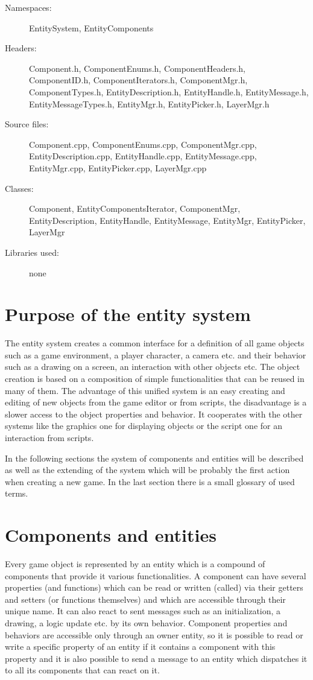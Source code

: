 \begin{description}
  \item[Namespaces:] EntitySystem, EntityComponents
  \item[Headers:] Component.h, ComponentEnums.h, ComponentHeaders.h, ComponentID.h, ComponentIterators.h, ComponentMgr.h, Com\-po\-nent\-Ty\-pes\-.h, EntityDescription.h, EntityHandle.h, EntityMessage.h, Entity\-Message\-Types.h, EntityMgr.h, EntityPicker.h, LayerMgr.h
  \item[Source files:] Component.cpp, ComponentEnums.cpp, ComponentMgr.cpp, EntityDescription.cpp, EntityHandle.cpp, EntityMessage.cpp, Entity\-Mgr.cpp, EntityPicker.cpp, LayerMgr.cpp
  \item[Classes:] Component, EntityComponentsIterator, ComponentMgr, EntityDescription, EntityHandle, EntityMessage, EntityMgr, EntityPicker, LayerMgr
  \item[Libraries used:] none
\end{description}

\section{Purpose of the entity system}

The entity system creates a common interface for a definition of all game objects such as a game environment, a player character, a camera etc. and their behavior such as a drawing on a screen, an interaction with other objects etc. The object creation is based on a composition of simple functionalities that can be reused in many of them. The advantage of this unified system is an easy creating and editing of new objects from the game editor or from scripts, the disadvantage is a slower access to the object properties and behavior. It cooperates with the other systems like the graphics one for displaying objects or the script one for an interaction from scripts.

In the following sections the system of components and entities will be described as well as the extending of the system which will be probably the first action when creating a new game. In the last section there is a small glossary of used terms.

\section{Components and entities}

Every game object is represented by an entity which is a compound of components that provide it various functionalities. A component can have several properties (and functions) which can be read or written (called) via their getters and setters (or functions themselves) and which are accessible through their unique name. It can also react to sent messages such as an initialization, a drawing, a logic update etc. by its own behavior. Component properties and behaviors are accessible only through an owner entity, so it is possible to read or write a specific property of an entity if it contains a component with this property and it is also possible to send a message to an entity which dispatches it to all its components that can react on it.


